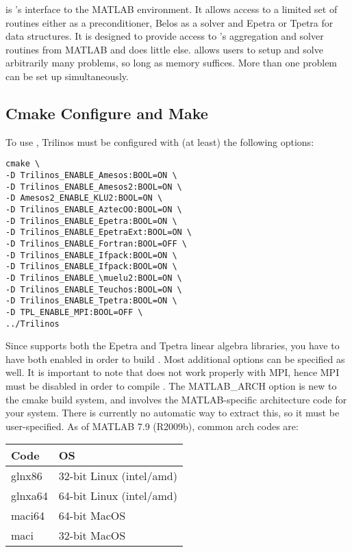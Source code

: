 \muemex is \muelu's interface to the MATLAB environment. It allows access
to a limited set of routines either \muelu as a preconditioner,
Belos as a solver and Epetra or Tpetra for data structures.
It is designed to provide access to \muelu's aggregation and
solver routines from MATLAB and does little else. \muemex allows users to
setup and solve arbitrarily many problems, so long as memory suffices.
More than one problem can be set up simultaneously.

\subsection{Cmake Configure and Make}\label{sec:muemex:cmake}
To use \muemex, Trilinos must be configured with (at least) the
following options:

\begin{verbatim}
cmake \
-D Trilinos_ENABLE_Amesos:BOOL=ON \
-D Trilinos_ENABLE_Amesos2:BOOL=ON \
-D Amesos2_ENABLE_KLU2:BOOL=ON \
-D Trilinos_ENABLE_AztecOO:BOOL=ON \
-D Trilinos_ENABLE_Epetra:BOOL=ON \
-D Trilinos_ENABLE_EpetraExt:BOOL=ON \
-D Trilinos_ENABLE_Fortran:BOOL=OFF \
-D Trilinos_ENABLE_Ifpack:BOOL=ON \
-D Trilinos_ENABLE_Ifpack:BOOL=ON \
-D Trilinos_ENABLE_\muelu2:BOOL=ON \
-D Trilinos_ENABLE_Teuchos:BOOL=ON \
-D Trilinos_ENABLE_Tpetra:BOOL=ON \
-D TPL_ENABLE_MPI:BOOL=OFF \
../Trilinos
\end{verbatim}

Since \muemex supports both the Epetra and Tpetra linear algebra
libraries, you have to have both enabled in order to build \muemex.
Most additional options can be specified as well.  It is important to
note that \muemex does not work properly with MPI, hence MPI must be
disabled in order to compile \muemex.  The MATLAB\_ARCH option is new to
the cmake build system, and involves the MATLAB-specific architecture
code for your system.  There is currently no automatic way to extract
this, so it must be user-specified.  As of MATLAB 7.9 (R2009b), common
arch codes are:
\begin{center}
\begin{tabular}{l|l}
Code& OS\\
\hline
glnx86& 32-bit Linux (intel/amd)\\
glnxa64& 64-bit Linux (intel/amd)\\
maci64& 64-bit MacOS\\
maci& 32-bit MacOS\\
\end{tabular}
\end{center}

